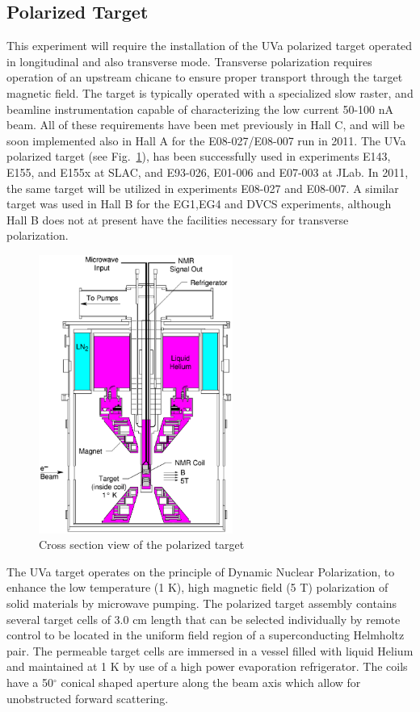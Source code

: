 \subsection{Polarized Target}
This experiment will require the installation of the
UVa polarized target operated in longitudinal and also transverse mode.  Transverse polarization requires  operation of an upstream chicane to ensure proper transport through the target magnetic field.  The target is typically operated with a specialized slow raster, and beamline instrumentation capable of characterizing the low current 50-100 nA beam.
All of these requirements have been met previously in Hall C, and will be soon implemented
also in Hall A for the E08-027/E08-007 run in 2011. 
%
The UVa polarized target (see Fig.~\ref{fig:target}), 
has been successfully used in experiments E143, E155, and E155x at SLAC, and E93-026, E01-006 and E07-003 at JLab. In 2011, the same target will be utilized in experiments E08-027 and E08-007. 
A similar target was used in Hall B for the EG1,EG4 and DVCS experiments, although Hall B does
not at present have the facilities necessary for transverse polarization.
%
\begin{figure}[h]
\centering
\includegraphics[width=2.5in,clip]{figs/target_gimp.eps}
\caption{Cross section view of the polarized target  \label{fig:target}}
\end{figure}

The UVa target operates on the principle of Dynamic Nuclear Polarization, to
enhance the low temperature (1 K), high magnetic field (5 T) polarization of solid
materials  by microwave pumping.
The polarized target assembly contains several target cells of 3.0 cm length
that can be  selected individually by remote control to be located in the uniform field
region of a superconducting Helmholtz pair. The permeable target cells are
immersed in a  vessel filled with liquid Helium and maintained at 1 K by use of a
high power evaporation refrigerator.
The coils have a 50$^\circ$ conical shaped aperture along the beam axis
which allow for unobstructed forward scattering.


